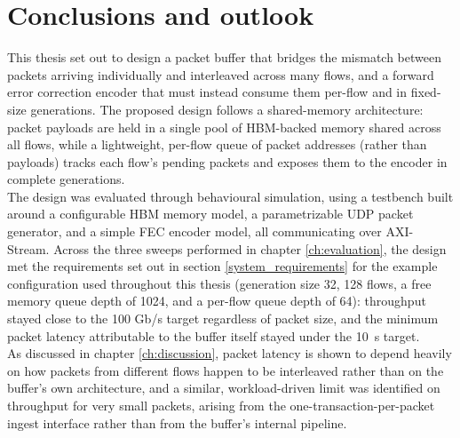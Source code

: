 %
\chapter{Conclusions and outlook}\label{ch:conclusion}

This thesis set out to design a packet buffer that bridges the mismatch between packets
arriving individually and interleaved across many flows, and a forward error correction
encoder that must instead consume them per-flow and in fixed-size generations. The proposed
design follows a shared-memory architecture: packet payloads are held in a single pool of
HBM-backed memory shared across all flows, while a lightweight, per-flow queue of packet
addresses (rather than payloads) tracks each flow's pending packets and exposes them to the
encoder in complete generations. \\

The design was evaluated through behavioural simulation, using a testbench built around a
configurable HBM memory model, a parametrizable UDP packet generator, and a simple FEC encoder
model, all communicating over AXI-Stream. Across the three sweeps performed in
chapter \ref{ch:evaluation}, the design met the requirements set out in
section \ref{system_requirements} for the example configuration used throughout this thesis
(generation size 32, 128 flows, a free memory queue depth of 1024, and a per-flow queue depth
of 64): throughput stayed close to the 100 Gb/s target regardless of packet size, and the
minimum packet latency attributable to the buffer itself stayed under the 10~\textmu s target. \\

As discussed in chapter \ref{ch:discussion}, packet latency is shown
to depend heavily on how packets from different flows happen to be interleaved rather than on
the buffer's own architecture, and a similar, workload-driven limit was identified on
throughput for very small packets, arising from the one-transaction-per-packet ingest
interface rather than from the buffer's internal pipeline. \\

